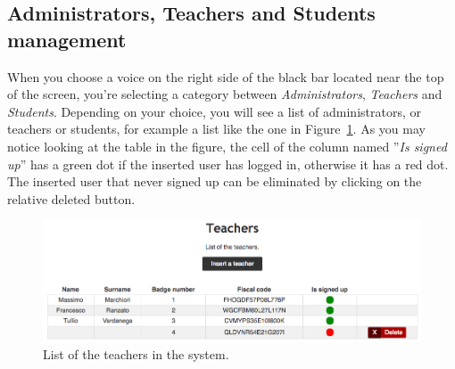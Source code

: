 \subsection{Administrators, Teachers and Students management} \label{subsec:ats}
When you choose a voice on the right side of the black bar located near the top of the screen, you're selecting a category between \emph{Administrators}, \emph{Teachers} and \emph{Students}.  Depending on your choice, you will see a list of administrators, or teachers or students, for example a list like the one in Figure~\ref{fig:userList}. As you may notice looking at the table in the figure, the cell of the column named ''\emph{Is signed up}'' has a green dot if the inserted user has logged in, otherwise it has a red dot. The inserted user that never signed up can be eliminated by clicking on the relative deleted button.
\begin{figure}[H]
	\centering
	\includegraphics[width=1.0\textwidth]{img/userList.png}
	\caption{List of the teachers in the system.}
	\label{fig:userList}
\end{figure}

